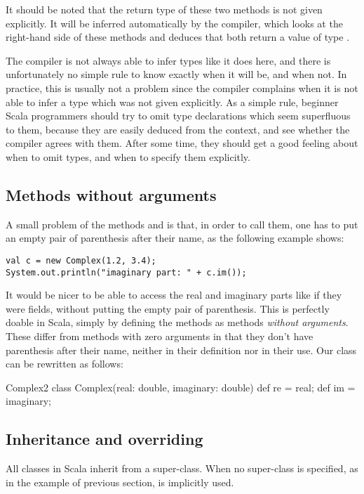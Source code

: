 \documentclass[a4paper,12pt,twoside,titlepage]{article}
\newcommand{\langname}[1]{#1\xspace}
\newcommand{\Scala}{\langname{Scala}}
\newcommand{\ident}[1]{\code{#1}\xspace}
\begin{document}
It should be noted that the return type of these two methods is not
given explicitly. It will be inferred automatically by the compiler,
which looks at the right-hand side of these methods and deduces that
both return a value of type \ident{double}.

The compiler is not always able to infer types like it does here, and
there is unfortunately no simple rule to know exactly when it will be,
and when not. In practice, this is usually not a problem since the
compiler complains when it is not able to infer a type which was not
given explicitly. As a simple rule, beginner \Scala programmers
should try to omit type declarations which seem superfluous to them,
because they are easily deduced from the context, and see whether the
compiler agrees with them. After some time, they should get a good
feeling about when to omit types, and when to specify them
explicitly.

\subsection{Methods without arguments}
\label{sec:meth-wo-args}

A small problem of the methods \ident{re} and \ident{im} is that, in
order to call them, one has to put an empty pair of parenthesis after
their name, as the following example shows:
\begin{lstlisting}[escapechar=\#]
val c = new Complex(1.2, 3.4);
System.out.println("imaginary part: " + c.im());
\end{lstlisting}
It would be nicer to be able to access the real and imaginary parts
like if they were fields, without putting the empty pair of
parenthesis. This is perfectly doable in \Scala, simply by defining
the methods as methods \emph{without arguments}. These differ from
methods with zero arguments in that they don't have parenthesis after
their name, neither in their definition nor in their use. Our
\ident{Complex} class can be rewritten as follows:
\begin{scalaprogram}{Complex2}
class Complex(real: double, imaginary: double) {
  def re = real;
  def im = imaginary;
}
\end{scalaprogram}

\subsection{Inheritance and overriding}
\label{sec:inheritance}

All classes in \Scala inherit from a super-class. When no super-class
is specified, as in the \ident{Complex} example of previous section,
\ident{scala.Object} is implicitly used.
\end{document}
